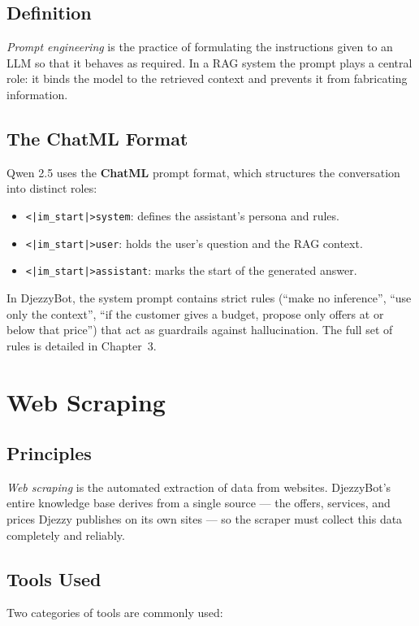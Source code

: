 \documentclass[12pt, a4paper]{report}
\newcommand{\humantext}[1]{#1}      %
\begin{document}
\subsection{Definition}
\humantext{\textit{Prompt engineering} is the practice of formulating the instructions given to an LLM so that it behaves as required. In a RAG system the prompt plays a central role: it binds the model to the retrieved context and prevents it from fabricating information.}

\subsection{The ChatML Format}
\humantext{Qwen 2.5 uses the \textbf{ChatML} prompt format, which structures the conversation into distinct roles:}
\begin{itemize}[noitemsep]
    \item \humantext{\texttt{<|im\_start|>system}: defines the assistant's persona and rules.}
    \item \humantext{\texttt{<|im\_start|>user}: holds the user's question and the RAG context.}
    \item \humantext{\texttt{<|im\_start|>assistant}: marks the start of the generated answer.}
\end{itemize}

\humantext{In DjezzyBot, the system prompt contains strict rules (``make no inference'', ``use only the context'', ``if the customer gives a budget, propose only offers at or below that price'') that act as guardrails against hallucination. The full set of rules is detailed in Chapter~3.}

\section{Web Scraping}

\subsection{Principles}
\humantext{\textit{Web scraping} is the automated extraction of data from websites. DjezzyBot's entire knowledge base derives from a single source --- the offers, services, and prices Djezzy publishes on its own sites --- so the scraper must collect this data completely and reliably.}

\subsection{Tools Used}
\humantext{Two categories of tools are commonly used:}
\end{document}
